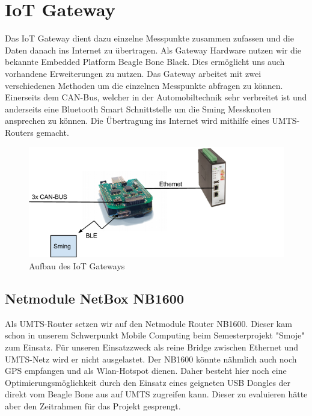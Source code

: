 \chapter{IoT Gateway}\label{chap:iotgateway}

Das IoT Gateway dient dazu einzelne Messpunkte zusammen zufassen und die Daten danach ins Internet zu übertragen. Als Gateway Hardware nutzen wir die bekannte Embedded Platform Beagle Bone Black. Dies ermöglicht uns auch vorhandene Erweiterungen zu nutzen. Das Gateway arbeitet mit zwei verschiedenen Methoden um die einzelnen Messpunkte abfragen zu können. Einerseits dem CAN-Bus, welcher in der Automobiltechnik sehr verbreitet ist und anderseits eine Bluetooth Smart Schnittstelle um die Sming Messknoten ansprechen zu können. Die Übertragung ins Internet wird mithilfe eines UMTS-Routers gemacht.



\begin{figure}[hbtp]
    \center
    \includegraphics[width=\textwidth]{bilder/aufbau_in_auto.png}
    \caption{Aufbau des IoT Gateways}
    \label{fig:aufbau_iot_gateway}
\end{figure}

\clearpage
\section{Netmodule NetBox NB1600}\label{sec:netbox}
Als UMTS-Router setzen wir auf den Netmodule Router NB1600. Dieser kam schon in unserem Schwerpunkt Mobile Computing beim Semesterprojekt "Smoje" zum Einsatz. Für unseren Einsatzzweck als reine Bridge zwischen Ethernet und UMTS-Netz wird er nicht ausgelastet. Der NB1600 könnte nähmlich auch noch GPS empfangen und als Wlan-Hotspot dienen. Daher besteht hier noch eine Optimierungsmöglichkeit durch den Einsatz eines geigneten USB Dongles der direkt vom Beagle Bone aus auf UMTS zugreifen kann. Dieser zu evaluieren hätte aber den Zeitrahmen für das Projekt gesprengt.

